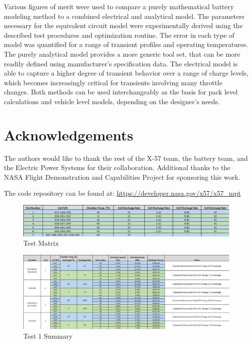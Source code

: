 \documentclass[]{aiaa-tc}%
\begin{document}
Various figures of merit were used to compare a purely mathematical battery modeling method to a combined electrical and analytical model. The parameters necessary for the equivalent circuit model were experimentally derived using the described test procedures and optimization routine. The error in each type of model was quantified for a range of transient profiles and operating temperatures. The purely analytical model provides a more generic tool set, that can be more readily defined using manufacturer's specification data. The electrical model is able to capture a higher degree of transient behavior over a range of charge levels, which becomes increasingly critical for transients involving many throttle changes. Both methods can be used interchangeably as the basis for pack level calculations and vehicle level models, depending on the designer's needs.


\section{Acknowledgements}

The authors would like to thank the rest of the X-57 team, the battery team, and the Electric Power Systems for their collaboration. Additional thanks to the NASA Flight Demonstration and Capabilities Project for sponsoring this work.





\pagebreak
The code repository can be found at:
\url{https://developer.nasa.gov/x57/x57_mpt}


\begin{figure}[!htb]
	\centering
	\includegraphics[width=1.0\textwidth]{figures/Test_Matrix.png}
	\caption{Test Matrix}
	\label{fig:TestMatrix}
\end{figure}

\begin{figure}[!htb]
	\centering
	\includegraphics[width=1.0\textwidth]{figures/Test1Summary.png}
	\caption{Test 1 Summary}
	\label{fig:Test1Summary}
\end{figure}
\end{document}
